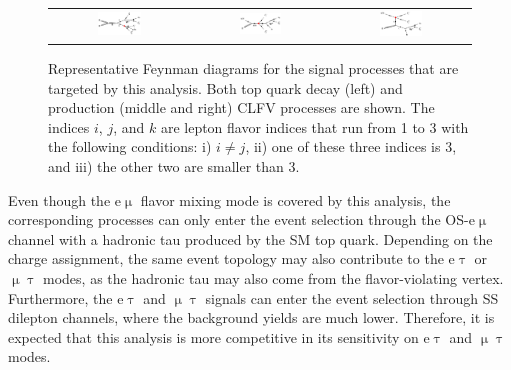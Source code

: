  \begin{figure}[tbh!]
 \begin{center}
 \begin{tabular}{ccc}
 \includegraphics[width=0.33\textwidth]{figures/Part4/Signal/TT}&
 \includegraphics[width=0.33\textwidth]{figures/Part4/Signal/ST1}&
 \includegraphics[width=0.33\textwidth]{figures/Part4/Signal/ST2}\\
 \end{tabular}
 \caption{Representative Feynman diagrams for the signal processes that are targeted by this analysis. Both top quark decay (left) and production (middle and right) \ac{CLFV} processes are shown. The indices $i$, $j$, and $k$ are lepton flavor indices that run from 1 to 3 with the following conditions: i) $i\neq j$, ii) one of these three indices is 3, and iii) the other two are smaller than 3.}
 \label{fig:Target}
 \end{center}
 \end{figure}

Even though the e$\upmu$ flavor mixing mode is covered by this analysis, the corresponding processes can only enter the event selection through the \ac{OS}-e$\upmu$ channel with a hadronic tau produced by the \ac{SM} top quark. Depending on the charge assignment, the same event topology may also contribute to the e$\uptau$ or $\upmu\uptau$ modes, as the hadronic tau may also come from the flavor-violating vertex. Furthermore, the e$\uptau$ and $\upmu\uptau$ signals can enter the event selection through \ac{SS} dilepton channels, where the background yields are much lower. Therefore, it is expected that this analysis is more competitive in its sensitivity on e$\uptau$ and $\upmu\uptau$ modes.
